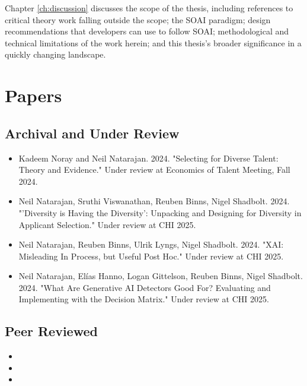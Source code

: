 Chapter \ref{ch:discussion} discusses the scope of the thesis, including references to critical theory work falling outside the scope; the SOAI paradigm; design recommendations that developers can use to follow SOAI; methodological and technical limitations of the work herein; and this thesis's broader significance in a quickly changing landscape. 

\section{Papers}
\subsection{Archival and Under Review}
\begin{itemize}
    \item Kadeem Noray and Neil Natarajan. 2024. "Selecting for Diverse Talent: Theory and Evidence." Under review at Economics of Talent Meeting, Fall 2024.
    \item Neil Natarajan, Sruthi Viswanathan, Reuben Binns, Nigel Shadbolt. 2024. "'Diversity is Having the Diversity': Unpacking and Designing for Diversity in Applicant Selection." Under review at CHI 2025.
    \item Neil Natarajan, Reuben Binns, Ulrik Lyngs, Nigel Shadbolt. 2024. "XAI: Misleading In Process, but Useful Post Hoc." Under review at CHI 2025.
    \item Neil Natarajan, Elías Hanno, Logan Gittelson, Reuben Binns, Nigel Shadbolt. 2024. "What Are Generative AI Detectors Good For? Evaluating and Implementing with the Decision Matrix." Under review at CHI 2025.
\end{itemize}

\subsection{Peer Reviewed}
\begin{itemize}
    \item {}
    \item {} 
    \item {}
\end{itemize}



